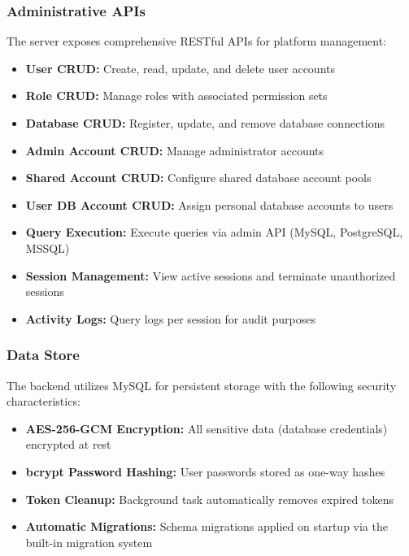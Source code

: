 \subsubsection{Administrative APIs}

The server exposes comprehensive RESTful APIs for platform management:

\begin{itemize}
    \item \textbf{User CRUD:} Create, read, update, and delete user accounts
    \item \textbf{Role CRUD:} Manage roles with associated permission sets
    \item \textbf{Database CRUD:} Register, update, and remove database connections
    \item \textbf{Admin Account CRUD:} Manage administrator accounts
    \item \textbf{Shared Account CRUD:} Configure shared database account pools
    \item \textbf{User DB Account CRUD:} Assign personal database accounts to users
    \item \textbf{Query Execution:} Execute queries via admin API (MySQL, PostgreSQL, MSSQL)
    \item \textbf{Session Management:} View active sessions and terminate unauthorized sessions
    \item \textbf{Activity Logs:} Query logs per session for audit purposes
\end{itemize}

\subsubsection{Data Store}

The backend utilizes MySQL for persistent storage with the following security characteristics:

\begin{itemize}
    \item \textbf{AES-256-GCM Encryption:} All sensitive data (database credentials) encrypted at rest
    \item \textbf{bcrypt Password Hashing:} User passwords stored as one-way hashes
    \item \textbf{Token Cleanup:} Background task automatically removes expired tokens
    \item \textbf{Automatic Migrations:} Schema migrations applied on startup via the built-in migration system
\end{itemize}

